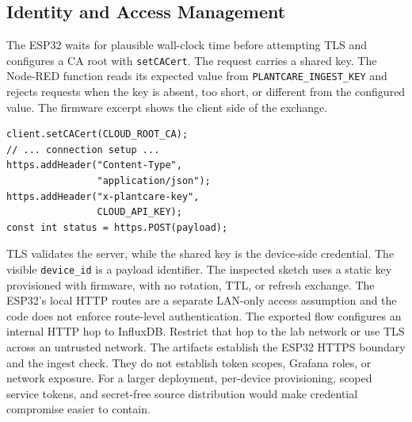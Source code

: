 \documentclass{ieeeaccess}
\newcommand{\code}[1]{\texttt{#1}}
\begin{document}
\subsection{Identity and Access Management}
The ESP32 waits for plausible wall-clock time before attempting TLS and configures a CA root with \code{setCACert}. The request carries a shared key. The Node-RED function reads its expected value from \code{PLANTCARE\_INGEST\_KEY} and rejects requests when the key is absent, too short, or different from the configured value. The firmware excerpt shows the client side of the exchange.
\begin{minipage}{\columnwidth}{\footnotesize
\begin{verbatim}
client.setCACert(CLOUD_ROOT_CA);
// ... connection setup ...
https.addHeader("Content-Type",
                "application/json");
https.addHeader("x-plantcare-key",
                CLOUD_API_KEY);
const int status = https.POST(payload);
\end{verbatim}
}\end{minipage}
TLS validates the server, while the shared key is the device-side credential. The visible \code{device\_id} is a payload identifier. The inspected sketch uses a static key provisioned with firmware, with no rotation, TTL, or refresh exchange. The ESP32's local HTTP routes are a separate LAN-only access assumption and the code does not enforce route-level authentication. The exported flow configures an internal HTTP hop to InfluxDB. Restrict that hop to the lab network or use TLS across an untrusted network. The artifacts establish the ESP32 HTTPS boundary and the ingest check. They do not establish token scopes, Grafana roles, or network exposure. For a larger deployment, per-device provisioning, scoped service tokens, and secret-free source distribution would make credential compromise easier to contain.
\end{document}
